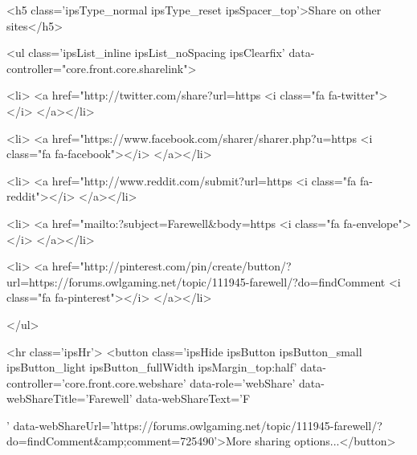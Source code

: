 	
	<h5 class='ipsType_normal ipsType_reset ipsSpacer_top'>Share on other sites</h5>
	

	<ul class='ipsList_inline ipsList_noSpacing ipsClearfix' data-controller="core.front.core.sharelink">
		
			<li>
<a href="http://twitter.com/share?url=https%
	<i class="fa fa-twitter"></i>
</a></li>
		
			<li>
<a href="https://www.facebook.com/sharer/sharer.php?u=https%
	<i class="fa fa-facebook"></i>
</a></li>
		
			<li>
<a href="http://www.reddit.com/submit?url=https%
	<i class="fa fa-reddit"></i>
</a></li>
		
			<li>
<a href="mailto:?subject=Farewell&body=https%
	<i class="fa fa-envelope"></i>
</a></li>
		
			<li>
<a href="http://pinterest.com/pin/create/button/?url=https://forums.owlgaming.net/topic/111945-farewell/?do=findComment%
	<i class="fa fa-pinterest"></i>
</a></li>
		
	</ul>


	<hr class='ipsHr'>
	<button class='ipsHide ipsButton ipsButton_small ipsButton_light ipsButton_fullWidth ipsMargin_top:half' data-controller='core.front.core.webshare' data-role='webShare' data-webShareTitle='Farewell' data-webShareText='F
 
' data-webShareUrl='https://forums.owlgaming.net/topic/111945-farewell/?do=findComment&amp;comment=725490'>More sharing options...</button>


